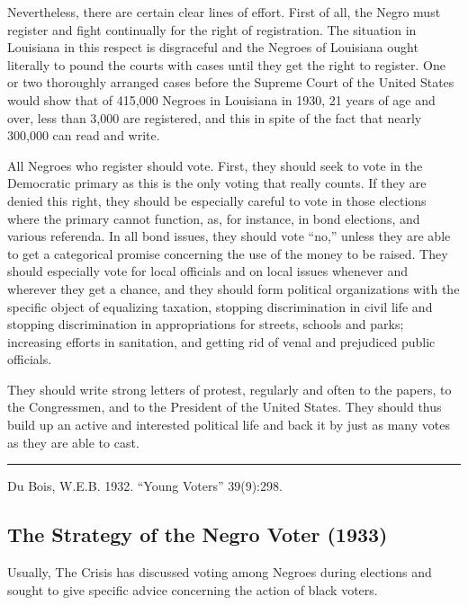 \documentclass[letterpaper,10pt,english]{jupyterBook}
\begin{document}
\sphinxAtStartPar
Nevertheless, there are certain clear lines of effort. First of all, the Negro must register and fight continually for the right of registration. The situation in Louisiana in this respect is disgraceful and the Negroes of Louisiana ought literally to pound the courts with cases until they get the right to register. One or two thoroughly arranged cases before the Supreme Court of the United States would show that of 415,000 Negroes in Louisiana in 1930, 21 years of age and over, less than 3,000 are registered, and this in spite of the fact that nearly 300,000 can read and write.

\sphinxAtStartPar
All Negroes who register should vote. First, they should seek to vote in the Democratic primary as this is the only voting that really counts. If they are denied this right, they should be especially careful to vote in those elections where the primary cannot function, as, for instance, in bond elections, and various referenda. In all bond issues, they should vote “no,” unless they are able to get a categorical promise concerning the use of the money to be raised. They should especially vote for local officials and on local issues whenever and wherever they get a chance, and they should form political organizations with the specific object of equalizing taxation, stopping discrimination in civil life and stopping discrimination in appropriations for streets, schools and parks; increasing efforts in sanitation, and getting rid of venal and prejudiced public officials.

\sphinxAtStartPar
They should write strong letters of protest, regularly and often to the papers, to the Congressmen, and to the President of the United States. They should thus build up an active and interested political life and back it by just as many votes as they are able to cast.


\bigskip\hrule\bigskip


\sphinxAtStartPar
{} Du Bois, W.E.B. 1932. “Young Voters” 39(9):298.


\subsection{The Strategy of the Negro Voter (1933)}
\label{\detokenize{Volumes/40/06/strategy_of_the_negro_voter:the-strategy-of-the-negro-voter-1933}}\label{\detokenize{Volumes/40/06/strategy_of_the_negro_voter::doc}}
\sphinxAtStartPar
Usually, The Crisis has discussed voting among Negroes during elections and sought to give specific advice concerning the action of black voters.
\end{document}
